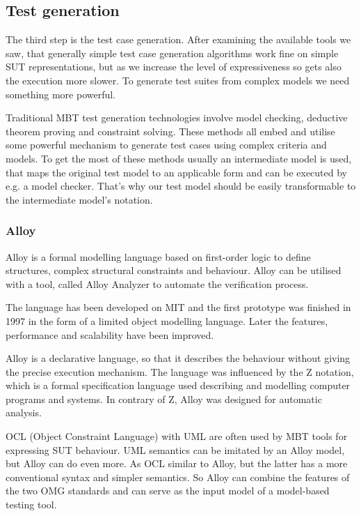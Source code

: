 
\subsection{Test generation}
\label{sub:designtestgeneration}

The third step is the test case generation. After examining the available tools we saw, that generally simple test case generation algorithms work fine on simple SUT representations, but as we increase the level of expressiveness so gets also the execution more slower. To generate test suites from complex models we need something more powerful.

Traditional MBT test generation technologies involve model checking, deductive theorem proving and constraint solving. These methods all embed and utilise some powerful mechanism to generate test cases using complex criteria and models. To get the most of these methods usually an intermediate model is used, that maps the original test model to an applicable form and can be executed by e.g. a model checker. That's why our test model should be easily transformable to the intermediate model's notation.

\subsubsection{Alloy}
\label{ssub:alloy}

Alloy \cite{alloy}\cite{alloyfirst}\cite{psm2alloy} is a formal modelling language based on first-order logic to define structures, complex structural constraints and behaviour. Alloy can be utilised with a tool, called Alloy Analyzer to automate the verification process.

The language has been developed on MIT and the first prototype was finished in 1997 in the form of a limited object modelling language. Later the features, performance and scalability have been improved.

Alloy is a declarative language, so that it describes the behaviour without giving the precise execution mechanism. The language was influenced by the Z notation, which is a formal specification language used describing and modelling computer programs and systems. In contrary of Z, Alloy was designed for automatic analysis.

OCL (Object Constraint Language) with UML are often used by MBT tools for expressing SUT behaviour. UML semantics can be imitated by an Alloy model, but Alloy can do even more. As OCL similar to Alloy, but the latter has a more conventional syntax and simpler semantics. So Alloy can combine the features of the two OMG standards and can serve as the input model of a model-based testing tool.

